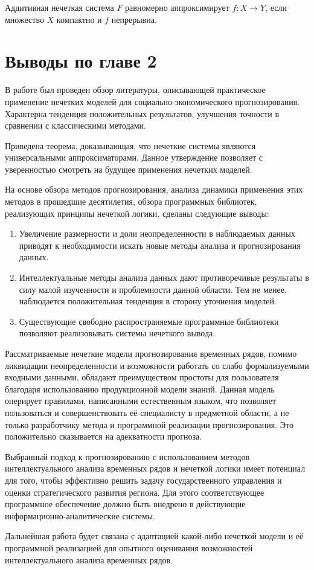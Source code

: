 \begin{theorem}
	\label{theorem:FAT}
	Аддитивная нечеткая система  $F$ равномерно аппроксимирует $f: X\rightarrow Y$, если множество $X$ компактно и $f$ непрерывна.
\end{theorem}

\section*{Выводы по главе 2}

В работе был проведен обзор литературы, описывающей практическое применение нечетких моделей для социально-экономического прогнозирования. Характерна тенденция положительных результатов, улучшения точности в сравнении с классическими методами.

Приведена теорема, доказывающая, что нечеткие системы являются универсальными аппроксиматорами. Данное утверждение позволяет с уверенностью смотреть на будущее применения нечетких моделей.

На основе обзора методов прогнозирования, анализа динамики применения этих методов в прошедшие десятилетия, 
обзора программных библиотек, реализующих принципы нечеткой логики, сделаны следующие выводы:
\begin{enumerate}
    \item Увеличение размерности и доли неопределенности в наблюдаемых данных приводят к необходимости искать новые методы анализа и прогнозирования данных.
    \item Интеллектуальные методы анализа данных дают противоречивые результаты в силу малой изученности и проблемности данной области. Тем не менее, наблюдается положительная тенденция в сторону уточнения моделей.
    \item Существующие свободно распространяемые программные библиотеки позволяют реализовывать системы нечеткого вывода. 
\end{enumerate}

Рассматриваемые нечеткие модели прогнозирования временных рядов, помимо ликвидации неопределенности и возможности работать со слабо формализуемыми входными данными, 
обладают преимуществом простоты для пользователя благодаря использованию продукционной модели знаний. 
Данная модель оперирует правилами, написанными естественным языком, что позволяет пользоваться и совершенствовать её специалисту в предметной области, 
а не только разработчику метода и программной реализации прогнозирования. 
Это положительно сказывается на адекватности прогноза.

Выбранный подход к прогнозированию с использованием методов интеллектуального анализа временных рядов и нечеткой логики имеет потенциал для того, 
чтобы эффективно решить задачу государственного управления и оценки стратегического развития региона. 
Для этого соответствующее программное обеспечение должно быть внедрено в действующие информационно-аналитические системы. 

Дальнейшая работа будет связана с адаптацией какой-либо нечеткой модели 
и её программной реализацией для опытного оценивания возможностей интеллектуального анализа временных рядов.


